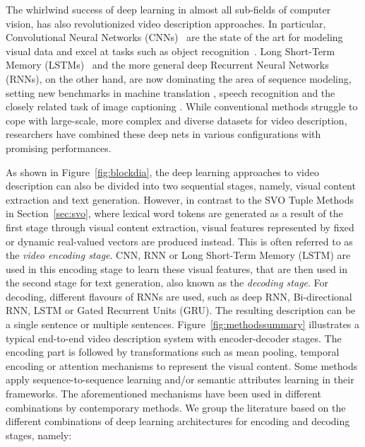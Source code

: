 \documentclass[10pt,journal,compsoc]{IEEEtran}
\begin{document}
The whirlwind success of deep learning in almost all sub-fields of computer vision, has also revolutionized video description approaches. In particular, Convolutional Neural Networks (CNNs)~\cite{krizhevsky2012imagenet} are the state of the art for modeling visual data and excel at tasks such as object recognition~\cite{krizhevsky2012imagenet, simonyan2014very, szegedy2015going}. Long Short-Term Memory (LSTMs)~\cite{hochreiter1997long} and the more general deep Recurrent Neural Networks (RNNs), on the other hand, are now dominating the area of sequence modeling, setting new benchmarks in machine translation \cite{sutskever2014sequence, cho2014properties}, speech recognition \cite{graves2014towards} and the closely related task of image captioning \cite{donahue2015long, vinyals2015show}. While conventional methods struggle to cope with large-scale, more complex and diverse datasets for video description, researchers have combined these deep nets in various configurations with promising performances.

As shown in Figure~\ref{fig:blockdia}, the deep learning approaches to video description can also be divided into two sequential stages, namely, visual content extraction and text generation. However, in contrast to the SVO Tuple Methods in Section~\ref{sec:svo}, where lexical word tokens are generated as a result of the first stage through visual content extraction, visual features represented by fixed or dynamic real-valued vectors are produced instead. This is often referred to as the {\it video encoding stage}.  CNN, RNN or Long Short-Term Memory (LSTM) are used in this encoding stage to learn these visual features, that are then used in the second stage for text generation, also known as the {\it decoding stage}. For decoding, different flavours of RNNs are used, such as deep RNN, Bi-directional RNN, LSTM or Gated Recurrent Units (GRU). The resulting description can be a single sentence or multiple sentences. Figure~\ref{fig:methodssummary} illustrates a typical end-to-end video description system with encoder-decoder stages. The encoding part is followed by transformations such as mean pooling, temporal encoding or attention mechanisms to represent the visual content. Some methods apply sequence-to-sequence learning and/or semantic attributes learning in their frameworks. The aforementioned mechanisms have been used in different combinations by contemporary methods. We group the literature based on the different combinations of deep learning architectures for encoding and decoding stages, namely:
\end{document}

